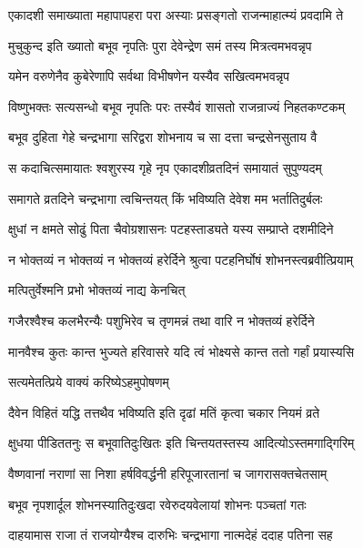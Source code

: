 \twolineshloka
{एकादशी समाख्याता महापापहरा परा}
{अस्याः प्रसङ्गतो राजन्माहात्म्यं प्रवदामि ते}%

\twolineshloka
{मुचुकुन्द इति ख्यातो बभूव नृपतिः पुरा}
{देवेन्द्रेण समं तस्य मित्रत्वमभवन्नृप}%

\twolineshloka
{यमेन वरुणेनैव कुबेरेणापि सर्वथा}
{विभीषणेन यस्यैव सखित्वमभवन्नृप}%

\twolineshloka
{विष्णुभक्तः सत्यसन्धो बभूव नृपतिः परः}
{तस्यैवं शासतो राजन्राज्यं निहतकण्टकम्}%

\twolineshloka
{बभूव दुहिता गेहे चन्द्रभागा सरिद्वरा}
{शोभनाय च सा दत्ता चन्द्रसेनसुताय वै}%

\twolineshloka
{स कदाचित्समायातः श्वशुरस्य गृहे नृप}
{एकादशीव्रतदिनं समायातं सुपुण्यदम् }%

\twolineshloka
{समागते व्रतदिने चन्द्रभागा त्वचिन्तयत्}
{किं भविष्यति देवेश मम भर्तातिदुर्बलः}%

\twolineshloka
{क्षुधां न क्षमते सोढुं पिता चैवोग्रशासनः}
{पटहस्ताड्यते यस्य सम्प्राप्ते दशमीदिने}%

\twolineshloka
{न भोक्तव्यं न भोक्तव्यं न भोक्तव्यं हरेर्दिने}
{श्रुत्वा पटहनिर्घोषं शोभनस्त्वब्रवीत्प्रियाम्}%

\onelineshloka
{मत्पितुर्वेश्मनि प्रभो भोक्तव्यं नाद्य केनचित्}%

\twolineshloka
{गजैरश्वैश्च कलभैरन्यैः पशुभिरेव  च}
{तृणमन्नं तथा वारि न भोक्तव्यं हरेर्दिने}%

\twolineshloka
{मानवैश्च कुतः कान्त भुज्यते हरिवासरे}
{यदि त्वं भोक्ष्यसे कान्त ततो गर्हां प्रयास्यसि}%

\onelineshloka
{सत्यमेतत्प्रिये वाक्यं करिष्येऽहमुपोषणम्}%

\twolineshloka
{दैवेन विहितं यद्धि तत्तथैव भविष्यति}
{इति दृढां मतिं कृत्वा चकार नियमं व्रते}%

\twolineshloka
{क्षुधया पीडिततनुः स बभूवातिदुःखितः}
{इति चिन्तयतस्तस्य आदित्योऽस्तमगाद्गिरिम्}%

\twolineshloka
{वैष्णवानां नराणां सा निशा हर्षविवर्द्धनी}
{हरिपूजारतानां च जागरासक्तचेतसाम्}%

\twolineshloka
{बभूव नृपशार्दूल शोभनस्यातिदुःखदा}
{रवेरुदयवेलायां शोभनः पञ्चतां गतः}%

\twolineshloka
{दाहयामास राजा तं राजयोग्यैश्च दारुभिः}
{चन्द्रभागा नात्मदेहं ददाह पतिना सह}%


